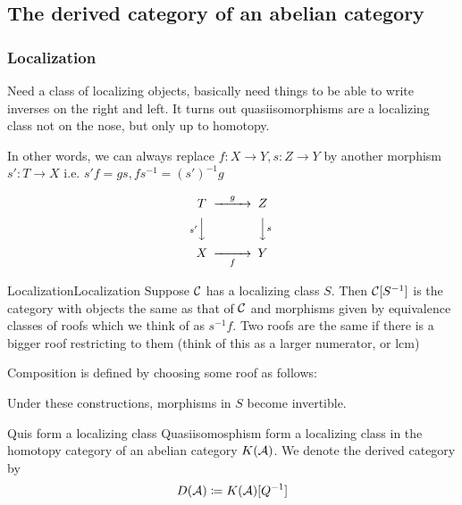 
\subsection{The derived category of an abelian category}

\subsubsection{Localization}

Need a class of localizing objects, basically need things to be able to write inverses on the right and left. It turns out quasiisomorphisms are a localizing class not on the nose, but only up to homotopy.

In other words, we can always replace $f:X\to Y, s:Z\to Y$ by another morphism $s':T\to X$ i.e. $s'f=gs,fs^{-1}=(s')^{-1}g$

\begin{equation*}
    \begin{CD}
        T @>g>> Z \\
          @Vs'VV @VVsV \\
        X @>>f> Y
    \end{CD}
\end{equation*}

\begin{definition}{Localization}{Localization}
    Suppose $\mathcal{C}$ has a localizing class $S$. Then $\mathcal{C}[S^{-1}]$ is the category with objects the same as that of $\mathcal{C}$ and morphisms given by equivalence classes of roofs which we think of as $s^{-1}f$. Two roofs are the same if there is a bigger roof restricting to them (think of this as a larger numerator, or lcm)
\end{definition}

Composition is defined by choosing some roof as follows: 

Under these constructions, morphisms in $S$ become invertible.

\begin{theorem}{}{Quis form a localizing class}
    Quasiisomosphism form a localizing class in the homotopy category of an abelian category $K(\mathcal{A})$. We denote the derived category by
    \begin{equation*}
        D(\mathcal{A})\coloneqq K(\mathcal{A})[Q^{-1}]
    \end{equation*}
\end{theorem}

